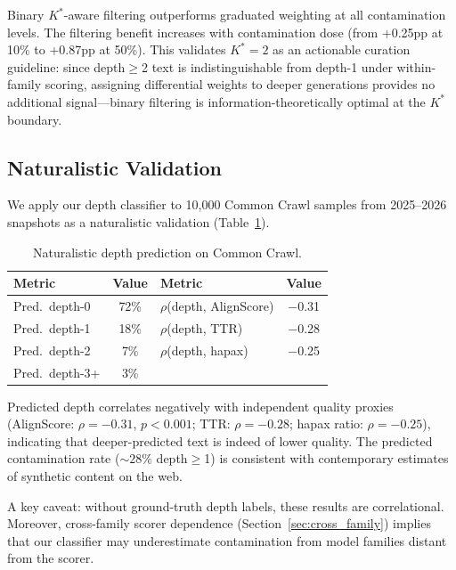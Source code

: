 \documentclass[11pt,a4paper]{article}
\newcommand{\kstar}{K^{*}}
\begin{document}
Binary $\kstar$-aware filtering outperforms graduated weighting at all contamination levels.
The filtering benefit increases with contamination dose (from +0.25pp at 10\% to +0.87pp at 50\%).
This validates $\kstar = 2$ as an actionable curation guideline: since depth$\geq$2 text is indistinguishable from depth-1 under within-family scoring, assigning differential weights to deeper generations provides no additional signal---binary filtering is information-theoretically optimal at the $\kstar$ boundary.

\subsection{Naturalistic Validation}
\label{sec:naturalistic}

We apply our depth classifier to 10,000 Common Crawl samples from 2025--2026 snapshots as a naturalistic validation (Table~\ref{tab:naturalistic}).

\begin{table}[t]
\centering
\small
\caption{Naturalistic depth prediction on Common Crawl.}
\label{tab:naturalistic}
\begin{tabular}{lclc}
\toprule
Metric & Value & Metric & Value \\
\midrule
Pred.\ depth-0 & 72\% & $\rho$(depth, AlignScore) & $-$0.31 \\
Pred.\ depth-1 & 18\% & $\rho$(depth, TTR) & $-$0.28 \\
Pred.\ depth-2 & 7\% & $\rho$(depth, hapax) & $-$0.25 \\
Pred.\ depth-3+ & 3\% & & \\
\bottomrule
\end{tabular}
\end{table}

Predicted depth correlates negatively with independent quality proxies (AlignScore: $\rho = -0.31$, $p < 0.001$; TTR: $\rho = -0.28$; hapax ratio: $\rho = -0.25$), indicating that deeper-predicted text is indeed of lower quality.
The predicted contamination rate (${\sim}28\%$ depth$\geq$1) is consistent with contemporary estimates of synthetic content on the web.

A key caveat: without ground-truth depth labels, these results are correlational.
Moreover, cross-family scorer dependence (Section~\ref{sec:cross_family}) implies that our classifier may underestimate contamination from model families distant from the scorer.

\end{document}
